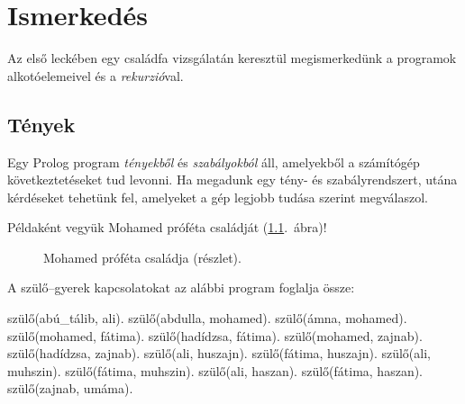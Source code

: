 
\chapter{Ismerkedés}

Az első leckében egy családfa vizsgálatán keresztül
megismerkedünk a programok alkotóelemeivel és a
\emph{rekurzió}\/val.

\section{Tények}

Egy Prolog program \emph{tényekből} és
\emph{szabályokból} áll, amelyekből a számítógép
következtetéseket tud levonni. Ha megadunk egy tény-
és szabályrendszert, utána kérdéseket tehetünk fel,
amelyeket a gép legjobb tudása szerint megválaszol.

Példaként vegyük Mohamed próféta családját
(\ref{fig:csaladfa}.~ábra)!
%
\begin{figure}
  \centering
  \caption{Mohamed próféta családja (részlet).}
  \label{fig:csaladfa}
\end{figure}
%
A szülő--gyerek kapcsolatokat az alábbi program
foglalja össze:

\begin{program}
szülő(abú_tálib, ali).
szülő(abdulla, mohamed).
szülő(ámna, mohamed).
szülő(mohamed, fátima).
szülő(hadídzsa, fátima).
szülő(mohamed, zajnab).
szülő(hadídzsa, zajnab).
szülő(ali, huszajn).
szülő(fátima, huszajn).
szülő(ali, muhszin).
szülő(fátima, muhszin).
szülő(ali, haszan).
szülő(fátima, haszan).
szülő(zajnab, umáma).
\end{program}

